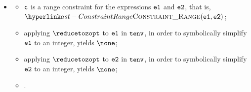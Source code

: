 \begin{itemize}
  \item {}
  \begin{itemize}
    \item $\vc$ is a range constraint for the expressions $\texttt{e1}$ and $\texttt{e2}$, that is, \\
          $\ConstraintRange(\veone, \vetwo)$;
    \item applying $\reducetozopt$ to $\texttt{e1}$ in $\texttt{tenv}$, in order to symbolically simplify $\texttt{e1}$ to an integer,
          yields $\none$;
    \item applying $\reducetozopt$ to $\texttt{e2}$ in $\texttt{tenv}$, in order to symbolically simplify $\texttt{e2}$ to an integer,
          yields $\none$;
    \item \Proseeqdef{$\vcopt$}{$\vc$}.
  \end{itemize}
\end{itemize}

\FormallyParagraph
\begin{mathpar}
\end{mathpar}

\begin{mathpar}
\end{mathpar}

\begin{mathpar}
\end{mathpar}


